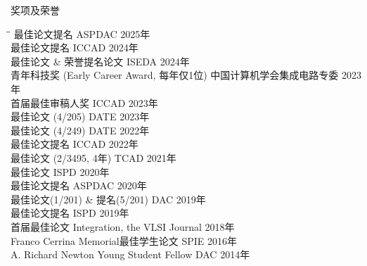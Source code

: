 
\begin{rSection}{奖项及荣誉}
\begin{tabbing}
\hspace{3.3in}\= \hspace{2.7in}\= \kill
最佳论文提名 \> ASPDAC \> { 2025年 } \\
最佳论文提名 \> ICCAD \> { 2024年 } \\
最佳论文 \& 荣誉提名论文 \> ISEDA \> { 2024年 } \\
青年科技奖 (Early Career Award, 每年仅1位) \> 中国计算机学会集成电路专委 \> { 2023年 } \\
首届最佳审稿人奖 \> ICCAD \> { 2023年 } \\
最佳论文 (4/205) \> DATE \> { 2023年 } \\
最佳论文 (4/249) \> DATE \> { 2022年 } \\
最佳论文提名 \> ICCAD \> { 2022年 } \\
最佳论文 (2/3495, 4年) \> TCAD \> { 2021年 } \\
最佳论文 \> ISPD \> { 2020年 } \\
最佳论文提名 \> ASPDAC \> { 2020年 } \\
最佳论文(1/201) \& 提名(5/201) \> DAC \> { 2019年 } \\
最佳论文提名 \> ISPD \> { 2019年 } \\
首届最佳论文 \> Integration, the VLSI Journal \> { 2018年 } \\
Franco Cerrina Memorial最佳学生论文 \> SPIE \> { 2016年 } \\
A. Richard Newton Young Student Fellow \> DAC \> { 2014年 } \\
\end{tabbing}
\end{rSection}

